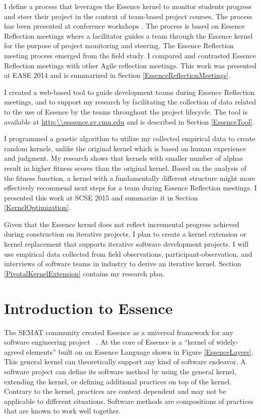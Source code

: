 \documentclass[preprint,12pt,3p]{elsarticle}
\begin{document}
I define a process that leverages the Essence kernel to monitor students progress and steer their project in the context of team-based project courses. The process has been presented at conference workshops \cite{SCSE2015Tutorial, CSEET2015Workshop}. The process is based on Essence Reflection meetings where a facilitator guides a team through the Essence kernel for the purpose of project monitoring and steering. The Essence Reflection meeting process emerged from the field study. I compared and contrasted Essence Reflection meetings with other Agile reflection meetings. This work was presented at EASE 2014 \cite{EASE2014} and is summarized in Section \ref{EssenceReflectionMeetings}.

I created a web-based tool to guide development teams during Essence Reflection meetings, and to support my research by facilitating the collection of data related to the use of Essence by the teams throughout the project lifecycle. The tool is available at \url{http:\\esssence.sv.cmu.edu} and is described in Section \ref{EssenceTool}.

I programmed a genetic algorithm to utilize my collected empirical data to create random kernels, unlike the original kernel which is based on human experience and judgment. My research shows that kernels with smaller number of alphas result in higher fitness scores than the original kernel. Based on the analysis of the fitness function, a kernel with a fundamentally different structure might more effectively recommend next steps for a team during Essence Reflection meetings. I presented this work at SCSE 2015 and summarize it in Section \ref{KernelOptimization}.

Given that the Essence kernel does not reflect incremental progress achieved during construction on iterative projects, I plan to create a kernel extension or kernel replacement that supports iterative software development projects. I will use empirical data collected from field observations, participant-observation, and interviews of software teams in industry to derive an iterative kernel. Section \ref{PivotalKernelExtension} contains my research plan.

\section{Introduction to Essence}
\label{Method}

The SEMAT community created Essence as a universal framework for any software engineering project ~\cite{JacobsonQueue}. At the core of Essence is a ``kernel of widely-agreed elements'' built on an Essence Language shown in Figure \ref{EssenceLayers}. This general kernel can theoretically support any kind of software endeavor. A software project can define its software method by using the general kernel, extending the kernel, or defining additional practices on top of the kernel. Contrary to the kernel, practices are context dependent and may not be applicable to different situations. Software methods are compositions of practices that are known to work well together.
\end{document}
